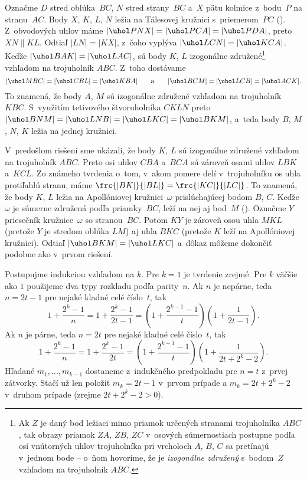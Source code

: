 {%
Označme $D$ stred oblúka~$BC$, $N$ stred strany~$BC$ a~$X$ pätu kolmice z~bodu~$P$ na stranu~$AC$. Body $X$, $K$, $L$, $N$ ležia na Tálesovej kružnici s~priemerom~$PC$ (\obr).
%
Z~obvodových uhlov máme $|\uhol PNX| = |\uhol PCA| = |\uhol PDA|$, preto $XN \parallel KL$. Odtiaľ $|LN|=|KX|$, z~čoho vyplýva $|\uhol LCN| = |\uhol KCA|$. Keďže $|\uhol BAK| = |\uhol LAC|$, sú body $K$, $L$ izogonálne združené\footnote{Ak $Z$ je daný bod ležiaci mimo priamok určených stranami trojuholníka $ABC$, tak obrazy priamok $ZA$, $ZB$, $ZC$ v~osových súmernostiach postupne podľa osí vnútorných uhlov trojuholníka pri vrcholoch $A$, $B$, $C$ sa pretínajú v~jednom bode -- o~ňom hovoríme, že je {\it izogonálne združený\/} s~bodom~$Z$ vzhľadom na trojuholník $ABC$.} vzhľadom na trojuholník $ABC$. Z~toho dostávame
$$
|\uhol MBC| = |\uhol CBL| = |\uhol KBA|\qquad\text{a}\qquad|\uhol BCM| = |\uhol LCB| = |\uhol ACK|.
$$
To znamená, že body $A$, $M$ sú izogonálne združené vzhľadom na trojuholník $KBC$. S~využitím tetivového štvoruholníka $CKLN$ preto $|\uhol BNM| = |\uhol LNB| = |\uhol LKC| = |\uhol BKM|$, a~teda body $B$, $M$, $N$, $K$ ležia na jednej kružnici.


\ineriesenie
V~predošlom riešení sme ukázali, že body $K$, $L$ sú izogonálne združené vzhľadom na trojuholník $ABC$. Preto osi uhlov $CBA$ a~$BCA$ sú zároveň osami uhlov $LBK$ a~$KCL$. Zo známeho tvrdenia o~tom, v~akom pomere delí v~trojuholníku os uhla protiľahlú stranu, máme $\frc{|BK|}{|BL|}=\frc{|KC|}{|LC|}$. To znamená, že body $K$, $L$ ležia na Apollóniovej kružnici~$\omega$ prislúchajúcej bodom $B$, $C$. Keďže $\omega$ je súmerne združená podľa priamky~$BC$, leží na nej aj bod~$M$ (\obr). Označme $Y$ priesečník kružnice~$\omega$ so stranou~$BC$. Potom $KY$ je zároveň osou uhla $MKL$ (pretože $Y$ je stredom oblúka $LM$) aj uhla $BKC$ (pretože $K$ leží na Apollóniovej kružnici). Odtiaľ $|\uhol BKM|=|\uhol LKC|$ a~dôkaz môžeme dokončiť podobne ako v~prvom riešení.
%
}

{%
Postupujme indukciou vzhľadom na $k$.
Pre $k=1$ je tvrdenie zrejmé. Pre $k$ väčšie ako $1$ použijeme dva typy rozkladu podľa parity~$n$.
Ak $n$ je nepárne, teda $n = 2t-1$ pre nejaké kladné celé číslo~$t$, tak
$$
1+\frac{2^k - 1}{n} = 1+\frac{2^k - 1}{2t-1} = \left(1 + \frac{2^{k-1} - 1}{t}\right)\left(1+\frac{1}{2t-1}\right).
$$
Ak $n$ je párne, teda $n = 2t$ pre nejaké kladné celé číslo~$t$, tak
$$
1+\frac{2^k - 1}{n} = 1+\frac{2^k - 1}{2t} = \left(1 + \frac{2^{k-1} - 1}{t}\right)\left (1 + \frac{1}{2t + 2^k - 2}\right ).
$$
Hľadané $m_1, \dots, m_{k-1}$ dostaneme z~indukčného predpokladu pre $n=t$ z~prvej zátvorky. Stačí už len položiť $m_k = 2t - 1$ v~prvom prípade a  $m_k = 2t + 2^k - 2$ v~druhom prípade (zrejme $2t + 2^k - 2 > 0$).}

